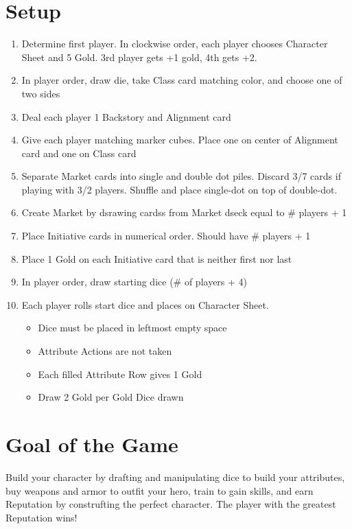 \documentclass[12pt]{article}
\newenvironment{enumerateCustom}
{\begin{enumerate}
  \setlength{\itemsep}{1pt}
  \setlength{\parskip}{0pt}
  \setlength{\parsep}{0pt}}
{\end{enumerate}}
\newenvironment{itemizeCustom}
{\begin{itemize}
  \setlength{\itemsep}{1pt}
  \setlength{\parskip}{0pt}
  \setlength{\parsep}{0pt}}
{\end{itemize}}
\begin{document}
\begin{multicols*}{2}

\section*{Setup}
    \begin{enumerateCustom}
        \item Determine first player. In clockwise order, each player chooses Character Sheet and 5 Gold. 3rd player gets +1 gold, 4th gets +2.
        \item In player order, draw die, take Class card matching color, and choose one of two sides
        \item Deal each player 1 Backstory and Alignment card
        \item Give each player matching marker cubes. Place one on center of Alignment card and one on Class card
        \item Separate Market cards into single and double dot piles. Discard 3/7 cards if playing with 3/2 players. Shuffle and place single-dot on top of double-dot.
        \item Create Market by dsrawing cardss from Market dseck equal to \# players + 1
        \item Place Initiative cards in numerical order. Should have \# players + 1
        \item Place 1 Gold on each Initiative card that is neither first nor last
        \item In player order, draw starting dice (\# of players + 4)
        \item Each player rolls start dice and places on Character Sheet.
            \begin{itemizeCustom}
                \item Dice must be placed in leftmost empty space
                \item Attribute Actions are not taken
                \item Each filled Attribute Row gives 1 Gold
                \item Draw 2 Gold per Gold Dice drawn
            \end{itemizeCustom}
    \end{enumerateCustom}

\section*{Goal of the Game}
Build your character by drafting and manipulating dice to build your attributes, buy weapons and armor to outfit your hero, train to gain skills, and earn Reputation by construfting the perfect character. The player with the greatest Reputation wins!


\end{multicols*}
\end{document}
